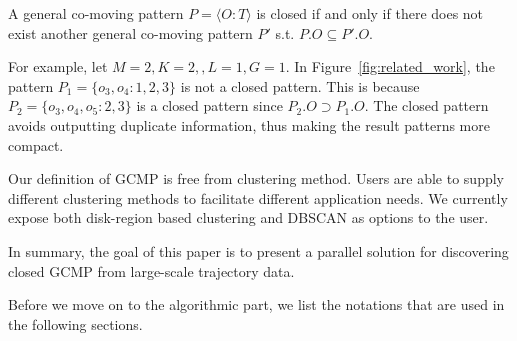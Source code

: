 \begin{definition}
A general co-moving pattern $P=\langle O:T \rangle$ is closed if and only if there does not exist another general co-moving pattern $P'$ s.t. $P.O \subseteq P'.O$.
\end{definition}

For example, let $M=2,K=2,,L=1,G=1$. In Figure~\ref{fig:related_work},
the pattern $P_1 = \{o_3,o_4:1,2,3\}$ is not a closed pattern. This is because $P_2=\{o_3,o_4,o_5:2,3\}$ is a closed pattern since $P_2.O \supset P_1.O$. The closed pattern avoids outputting duplicate information, thus making the result patterns more compact. 

Our definition of GCMP is free from clustering method. Users are able to supply different clustering methods to facilitate different application needs. 
We currently expose both disk-region based clustering and DBSCAN as options to the user.

In summary, the goal of this paper is to present a parallel solution for discovering closed GCMP from large-scale trajectory data.

Before we move on to the algorithmic part, we list the notations that are used in the following sections.

